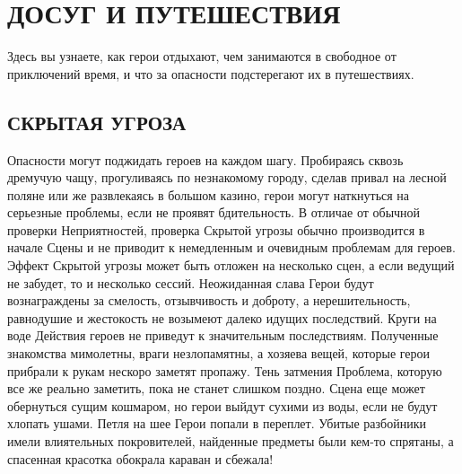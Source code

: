 \chapter{ДОСУГ И ПУТЕШЕСТВИЯ}
Здесь вы узнаете, как герои отдыхают, чем занимаются в свободное от приключений время, и что за опасности подстерегают их в путешествиях.
\section{СКРЫТАЯ УГРОЗА}
Опасности могут поджидать героев на каждом шагу. Пробираясь сквозь дремучую чащу, прогуливаясь по незнакомому городу, сделав привал на лесной поляне или же развлекаясь в большом казино, герои могут наткнуться на серьезные проблемы, если не проявят бдительность. В отличае от обычной проверки Неприятностей, проверка Скрытой угрозы обычно производится в начале Сцены и не приводит к немедленным и очевидным проблемам для героев. Эффект Скрытой угрозы может быть отложен на несколько сцен, а если ведущий не забудет, то и несколько сессий.
\trouble
{Неожиданная слава}%
{Герои будут вознаграждены за смелость, отзывчивость и доброту, а нерешительность, равнодушие и жестокость не возымеют далеко идущих последствий.}%
{Круги на воде}%
{Действия героев не приведут к значительным последствиям. Полученные знакомства мимолетны, враги незлопамятны, а хозяева вещей, которые герои прибрали к рукам нескоро заметят пропажу.}%
{Тень затмения}%
{Проблема, которую все же реально заметить, пока не станет слишком поздно. Сцена еще может обернуться сущим кошмаром, но герои выйдут сухими из воды, если не будут хлопать ушами.}%
{Петля на шее}%
{Герои попали в переплет. Убитые разбойники имели влиятельных покровителей, найденные предметы были кем-то спрятаны, а спасенная красотка обокрала караван и сбежала!}%

